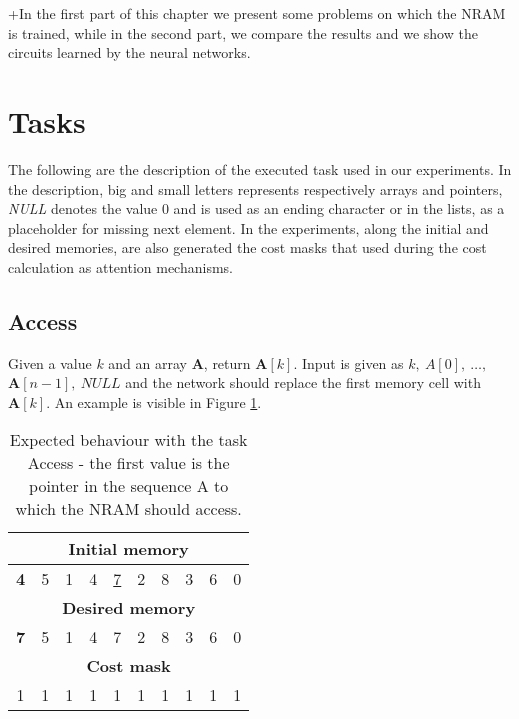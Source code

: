 \label{experiments}
+In the first part of this chapter we present some problems on which the NRAM is trained, while in the second part, we compare the results and we show the circuits learned by the neural networks.

\section{Tasks}
The following are the description of the executed task used in our experiments. In the description, big and small letters represents respectively arrays and pointers, \textit{NULL} denotes the value 0 and is used as an ending character or in the lists, as a placeholder for missing next element. In the experiments, along the initial and desired memories, are also generated the cost masks that used during the cost calculation as attention mechanisms.

\subsection{Access}
Given a value $k$ and an array \textbf{A}, return $\textbf{A}[k]$. Input is given as $k,\ A[0],\ \dots,\ $\\$\textbf{A}[n-1],\ \textit{NULL}$ and the network should replace the first memory cell with $\textbf{A}[k]$. An example is visible in Figure \ref{fig:access-example}.
\begin{table}[h!]
	\centering
	\begin{tabular}{|c|c|c|c|c|c|c|c|c|c|}
		\hline
		\multicolumn{10}{|c|}{\textbf{Initial memory}} \\ \hline
		\textbf{4} & 5 & 1 & 4 & \underline{7} & 2 & 8 & 3 & 6 & 0 \\ \hline\hline\hline
		\multicolumn{10}{|c|}{\textbf{Desired memory}} \\ \hline
		\textbf{7} & 5 & 1 & 4 & 7 & 2 & 8 & 3 & 6 & 0 \\ \hline\hline\hline
		\multicolumn{10}{|c|}{\textbf{Cost mask}} \\ \hline
		1 & 1 & 1 & 1 & 1 & 1 & 1 & 1 & 1 & 1 \\ \hline
	\end{tabular}
	\caption{Expected behaviour with the task Access - the first value is the pointer in the sequence A to which the NRAM should access.}
	\label{fig:access-example}
\end{table}
\FloatBarrier
